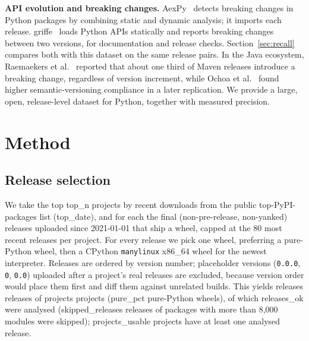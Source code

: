 \documentclass[10pt,twocolumn,letterpaper]{article}
\begin{document}
\textbf{API evolution and breaking changes.} AexPy~\cite{aexpy} detects breaking changes in Python packages by
combining static and dynamic analysis; it imports each release. griffe~\cite{griffe} loads Python APIs statically
and reports breaking changes between two versions, for documentation and release checks. Section~\ref{sec:recall}
compares both with this dataset on the same release pairs. In the Java ecosystem, Raemaekers et al.~\cite{raemaekers2014}
reported that about one third of Maven releases introduce a breaking change, regardless of version increment, while
Ochoa et al.~\cite{ochoa2022} found higher semantic-versioning compliance in a later replication. We provide a large,
open, release-level dataset for Python, together with measured precision.

\section{Method}\label{sec:method}
\subsection{Release selection}
We take the top {{top_n}} projects by recent downloads from the public top-PyPI-packages list ({{top_date}}),
and for each the final (non-pre-release, non-yanked) releases uploaded since 2021-01-01 that ship a wheel,
capped at the 80 most recent releases per project. For every release we pick one wheel, preferring a pure-Python
wheel, then a CPython \texttt{manylinux} x86\_64 wheel for the newest interpreter. Releases are ordered by version
number; placeholder versions (\texttt{0.0.0}, \texttt{0}, \texttt{0.0}) uploaded after a project's real releases are
excluded, because version order would place them first and diff them against unrelated builds. This yields
{{releases}} releases of {{projects}} projects ({{pure_pct}} pure-Python wheels), of which {{releases_ok}} were analysed
({{skipped_releases}} releases of packages with more than 8,000 modules were skipped); {{projects_usable}} projects have
at least one analysed release.
\end{document}
